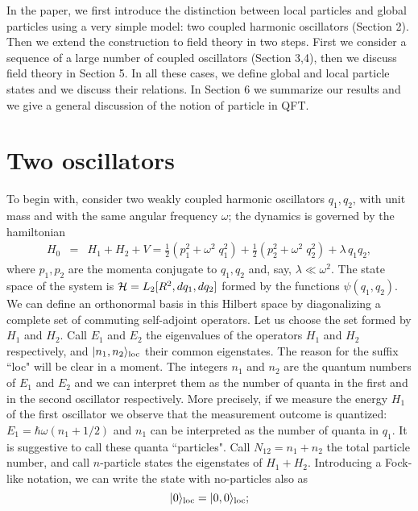 \documentclass[10pt, nofootinbib]{revtex4}
\newcommand{\bea}{\begin{eqnarray}}
\newcommand{\eea}{\end{eqnarray}}
\begin{document}
In the paper, we first introduce the distinction between local
particles and global particles using a very simple model: two coupled
harmonic oscillators (Section 2).  Then we extend the
construction to field theory in two steps.  First we consider a
sequence of a large number of coupled oscillators (Section 3,4), then we
discuss field theory in Section 5.  In all these cases, we define
global and local particle states and we discuss their relations.  In
Section 6 we summarize our results and we give a general discussion of
the notion of particle in QFT.

\section{Two oscillators}

To begin with, consider two weakly coupled harmonic oscillators $q_{1},
q_{2}$, with unit mass and with the same angular frequency $\omega$;
the dynamics is governed by the hamiltonian
%
\bea 
H_{0}&=& H_{1}+H_{2} + V = \frac{1}{2}\left(p_1^2 + \omega^2\; {q}_1^2
\right) + \frac{1}{2}\left(p_2^2 + \omega^2\; {q}_2^2 \right)
+\lambda\, q_{1}q_{2}, 
\eea
%
where $p_{1}, p_{2}$ are the momenta conjugate to $q_{1}, q_{2}$ and,
say, $\lambda\ll\omega^2$.  The state space of the system is ${\cal
H}=L_{2}[R^2,dq_{1},dq_{2}]$ formed by the functions
$\psi(q_{1},q_{2})$.  We can define an orthonormal basis in this
Hilbert space by diagonalizing a complete set of commuting
self-adjoint operators.  Let us choose the set formed by $H_{1}$ and
$H_{2}$.  Call $E_1$ and $E_2$ the eigenvalues of the operators
$H_{1}$ and $H_{2}$ respectively, and $|n_{1},n_{2}\rangle_{\rm loc}$
their common eigenstates.  The reason for the suffix ``loc" will be
clear in a moment.  The integers $n_{1}$ and $n_{2}$ are the quantum
numbers of $E_1$ and $E_2$ and we can interpret them as the number of
quanta in the first and in the second oscillator respectively.  More
precisely, if we measure the energy $H_{1}$ of the first oscillator we
observe that the measurement outcome is quantized:
$E_{1}=\hbar\omega(n_{1}+1/2)$ and $n_{1}$ can be interpreted as the
number of quanta in $q_{1}$.  It is suggestive to call these quanta
``particles".  Call $N_{12}=n_{1}+n_{2}$ the total particle number,
and call $n$-particle states the eigenstates of $H_{1}+H_{2}$. 
Introducing a Fock-like notation, we can write the state with
no-particles also as
\begin{equation} 
|0\rangle_{\rm loc}= |0,0\rangle_{\rm loc};
\label{120}
\end{equation}
\end{document}
